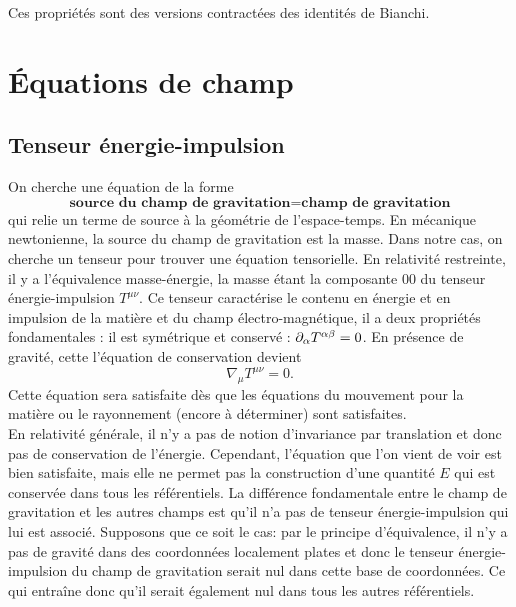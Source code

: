 \documentclass[a4paper,11pt]{report}
\begin{document}
        Ces propriétés sont des versions contractées des identités de Bianchi.
                
    \section{Équations de champ}
    
        \subsection{Tenseur énergie-impulsion}
        
            On cherche une équation de la forme
            \begin{equation*}
                \textbf{source du champ de gravitation} = \textbf{champ de gravitation}
            \end{equation*}
            qui relie un terme de source à la géométrie de l'espace-temps. En mécanique newtonienne, la source du champ de gravitation est la masse. Dans notre cas, on cherche un tenseur pour trouver une équation tensorielle. En relativité restreinte, il y a l'équivalence masse-énergie, la masse étant la composante $00$ du tenseur énergie-impulsion $T^{\mu\nu}$. Ce tenseur caractérise le contenu en énergie et en impulsion de la matière et du champ électro-magnétique, il a deux propriétés fondamentales : il est symétrique et conservé : $\partial_\alpha T^{\alpha\beta} = 0$. En présence de gravité, cette l'équation de conservation devient
            \begin{equation}
                \nabla_\mu T^{\mu\nu} = 0.
            \end{equation}
            Cette équation sera satisfaite dès que les équations du mouvement pour la matière ou le rayonnement (encore à déterminer) sont satisfaites.\\
            
            En relativité générale, il n'y a pas de notion d'invariance par translation et donc pas de conservation de l'énergie. Cependant, l'équation que l'on vient de voir est bien satisfaite, mais elle ne permet pas la construction d'une quantité $E$ qui est conservée dans tous les référentiels. La différence fondamentale entre le champ de gravitation et les autres champs est qu'il n'a pas de tenseur énergie-impulsion qui lui est associé. Supposons que ce soit le cas: par le principe d'équivalence, il n'y a pas de gravité dans des coordonnées localement plates et donc le tenseur énergie-impulsion du champ de gravitation serait nul dans cette base de coordonnées. Ce qui entraîne donc qu'il serait également nul dans tous les autres référentiels.
            
\end{document}
